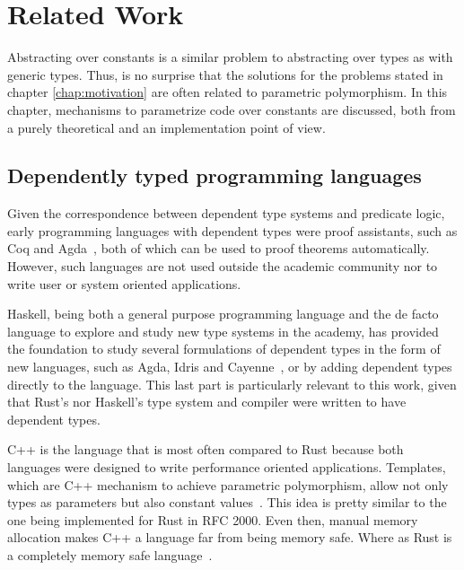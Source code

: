 \newcommand{\pdtn}[1] { \langle \text{#1} \rangle }

\chapter{Related Work}

\label{chap:related_work}

Abstracting over constants is a similar problem to abstracting over types as
with generic types. Thus, is no surprise that the solutions for the problems
stated in chapter \ref{chap:motivation} are often related to parametric
polymorphism. In this chapter, mechanisms to parametrize code over constants are
discussed, both from a purely theoretical and an implementation point of view.

\section{Dependently typed programming languages}

Given the correspondence between dependent type systems and predicate logic,
early programming languages with dependent types were proof assistants, such as
Coq and Agda~\cite{agda}, both of which can be used to proof theorems
automatically.  However, such languages are not used outside the academic
community nor to write user or system oriented applications.

Haskell, being both a general purpose programming language and the de facto
language to explore and study new type systems in the academy, has provided the
foundation to study several formulations of dependent types in the form of new
languages, such as Agda, Idris \cite{idris} and Cayenne~\cite{cayenne}, or by
adding dependent types directly to the language. This last part is particularly
relevant to this work, given that Rust's nor Haskell's type system and compiler
were written to have dependent types.

C++ is the language that is most often compared to Rust because both languages
were designed to write performance oriented applications. Templates, which are
C++ mechanism to achieve parametric polymorphism, allow not only types as
parameters but also constant values~\cite{templates}. This idea is pretty
similar to the one being implemented for Rust in RFC 2000. Even then, manual
memory allocation makes C++ a language far from being memory safe. Where as Rust
is a completely memory safe language~\cite{ralf}.    

